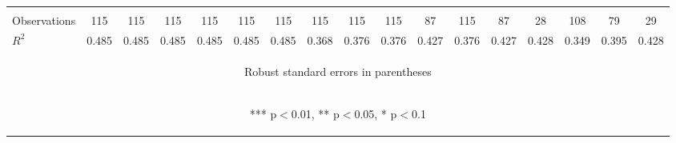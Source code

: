 \begin{center}
\begin{tabular}{lcccccccccccccccc}
\vspace{4pt} & \begin{footnotesize}\end{footnotesize} & \begin{footnotesize}\end{footnotesize} & \begin{footnotesize}\end{footnotesize} & \begin{footnotesize}\end{footnotesize} & \begin{footnotesize}\end{footnotesize} & \begin{footnotesize}\end{footnotesize} & \begin{footnotesize}\end{footnotesize} & \begin{footnotesize}\end{footnotesize} & \begin{footnotesize}\end{footnotesize} & \begin{footnotesize}\end{footnotesize} & \begin{footnotesize}\end{footnotesize} & \begin{footnotesize}\end{footnotesize} & \begin{footnotesize}\end{footnotesize} & \begin{footnotesize}\end{footnotesize} & \begin{footnotesize}\end{footnotesize} & \begin{footnotesize}\end{footnotesize} \\
Observations & 115 & 115 & 115 & 115 & 115 & 115 & 115 & 115 & 115 & 87 & 115 & 87 & 28 & 108 & 79 & 29 \\
 $R^2$ & 0.485 & 0.485 & 0.485 & 0.485 & 0.485 & 0.485 & 0.368 & 0.376 & 0.376 & 0.427 & 0.376 & 0.427 & 0.428 & 0.349 & 0.395 & 0.428 \\ \hline
\multicolumn{17}{c}{\begin{footnotesize} Robust standard errors in parentheses\end{footnotesize}} \\
\multicolumn{17}{c}{\begin{footnotesize} *** p$<$0.01, ** p$<$0.05, * p$<$0.1\end{footnotesize}} \\
\end{tabular}
\end{center}
